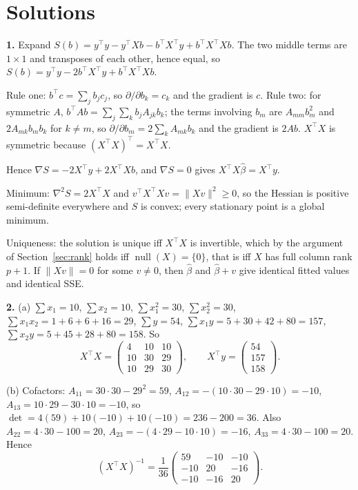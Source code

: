 \documentclass[11pt]{article}
\newcommand{\Xt}{X^{\!\top}}
\begin{document}
\section{Solutions}
\label{sec:solutions}

\textbf{1.} Expand
$S(b) = y^{\!\top}y - y^{\!\top}Xb - b^{\!\top}\Xt y + b^{\!\top}\Xt X b$. The
two middle terms are $1\times1$ and transposes of each other, hence equal, so
$S(b) = y^{\!\top}y - 2b^{\!\top}\Xt y + b^{\!\top}\Xt X b$.

Rule one: $b^{\!\top}c = \sum_j b_jc_j$, so
$\partial/\partial b_k = c_k$ and the gradient is $c$. Rule two: for
symmetric $A$, $b^{\!\top}Ab = \sum_j\sum_k b_jA_{jk}b_k$; the terms involving
$b_m$ are $A_{mm}b_m^2$ and $2A_{mk}b_mb_k$ for $k \ne m$, so
$\partial/\partial b_m = 2\sum_kA_{mk}b_k$ and the gradient is $2Ab$. $\Xt X$
is symmetric because $(\Xt X)^{\!\top} = \Xt X$.

Hence $\nabla S = -2\Xt y + 2\Xt Xb$, and $\nabla S = 0$ gives
$\Xt X\hat\beta = \Xt y$.

Minimum: $\nabla^2 S = 2\Xt X$ and $v^{\!\top}\Xt Xv = \|Xv\|^2 \ge 0$, so the
Hessian is positive semi-definite everywhere and $S$ is convex; every
stationary point is a global minimum.

Uniqueness: the solution is unique iff $\Xt X$ is invertible, which by the
argument of Section~\ref{sec:rank} holds iff $\operatorname{null}(X) = \{0\}$,
that is iff $X$ has full column rank $p+1$. If $\|Xv\| = 0$ for some
$v \ne 0$, then $\hat\beta$ and $\hat\beta + v$ give identical fitted values
and identical SSE.

\medskip
\textbf{2.} (a) $\sum x_1 = 10$, $\sum x_2 = 10$, $\sum x_1^2 = 30$,
$\sum x_2^2 = 30$, $\sum x_1x_2 = 1+6+6+16 = 29$, $\sum y = 54$,
$\sum x_1y = 5+30+42+80 = 157$, $\sum x_2y = 5+45+28+80 = 158$. So
\[
  \Xt X = \begin{pmatrix} 4 & 10 & 10\\ 10 & 30 & 29\\ 10 & 29 & 30
          \end{pmatrix},
  \qquad
  \Xt y = \begin{pmatrix} 54\\157\\158\end{pmatrix}.
\]

(b) Cofactors: $A_{11} = 30\cdot30 - 29^2 = 59$,
$A_{12} = -(10\cdot30 - 29\cdot10) = -10$,
$A_{13} = 10\cdot29 - 30\cdot10 = -10$, so
$\det = 4(59) + 10(-10) + 10(-10) = 236 - 200 = 36$. Also
$A_{22} = 4\cdot30 - 100 = 20$, $A_{23} = -(4\cdot29 - 10\cdot10) = -16$,
$A_{33} = 4\cdot30 - 100 = 20$. Hence
\[
  (\Xt X)^{-1} = \frac{1}{36}
  \begin{pmatrix} 59 & -10 & -10\\ -10 & 20 & -16\\ -10 & -16 & 20
  \end{pmatrix}.
\]
\end{document}
